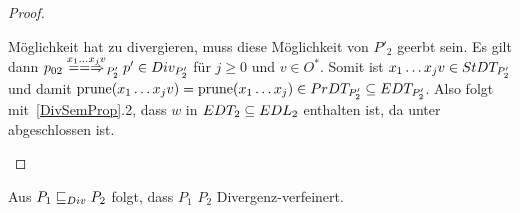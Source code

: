 \begin{proof}
\begin{itemize}
\begin{itemize}
          Möglichkeit hat zu divergieren, muss diese Möglichkeit von $P'_2$
          geerbt sein. Es gilt dann $p_{02} \lweakmay[x_1\dots x_j v]_{P'_2} p'
          \in Div _{P'_2}$ für $j\geq 0$ und $v\in O^*$. Somit ist $x_1\dots
          x_j v\in StDT _{P'_2}$ und damit $\mathrm{prune} (x_1\dots x_j v) = \mathrm{prune}
          (x_1\dots x_j)\in PrDT _{P'_2}\subseteq EDT _{P'_2}$. Also folgt
          mit~\ref{DivSemProp}.2, dass $w$ in $EDT _2 \subseteq EDL _2$
          enthalten ist, da \DT{} unter \cont{} abgeschlossen ist.
      \end{itemize}
  \end{itemize}
\end{proof}

\begin{Satz}
  \label{DivTestVerfSatz}
  Aus $P_1  \sqsubseteq  _{Div} P_2$ folgt, dass $P_1$ $P_2$ Divergenz-verfeinert.
\end{Satz}
